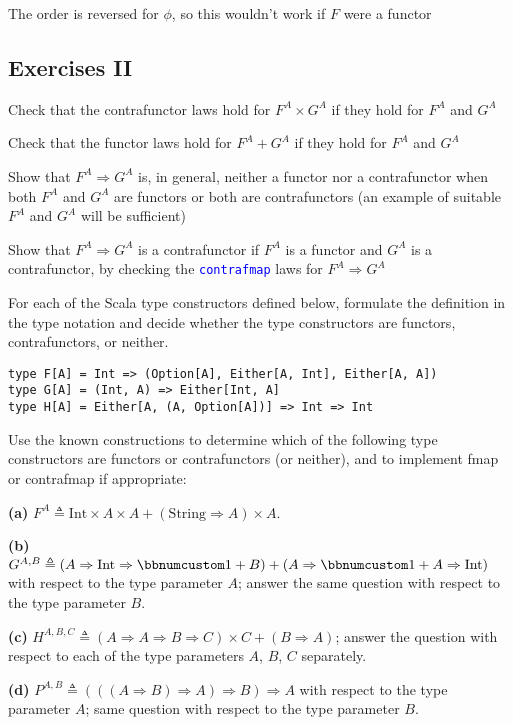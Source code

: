 The order is reversed for $\phi$, so this wouldn't work if $F$ were
a functor


\subsection{Exercises II}

Check that the contrafunctor laws hold for $F^{A}\times G^{A}$ if
they hold for $F^{A}$ and $G^{A}$

Check that the functor laws hold for $F^{A}+G^{A}$ if they hold for
$F^{A}$ and $G^{A}$

Show that $F^{A}\Rightarrow G^{A}$ is, in general, neither a functor
nor a contrafunctor when both $F^{A}$ and $G^{A}$ are functors or
both are contrafunctors (an example of suitable $F^{A}$ and $G^{A}$
will be sufficient)

Show that $F^{A}\Rightarrow G^{A}$ is a contrafunctor if $F^{A}$
is a functor and $G^{A}$ is a contrafunctor, by checking the \texttt{\textcolor{blue}{\footnotesize{}contrafmap}}
laws for $F^{A}\Rightarrow G^{A}$ 

For each of the Scala type constructors defined below, formulate the
definition in the type notation and decide whether the type constructors
are functors, contrafunctors, or neither.
\begin{lstlisting}
type F[A] = Int => (Option[A], Either[A, Int], Either[A, A])
type G[A] = (Int, A) => Either[Int, A]
type H[A] = Either[A, (A, Option[A])] => Int => Int
\end{lstlisting}

Use the known constructions to determine which of the following type
constructors are functors or contrafunctors (or neither), and to implement
fmap or contrafmap if appropriate:

\textbf{(a)} $F^{A}\triangleq\text{Int}\times A\times A+\left(\text{String}\Rightarrow A\right)\times A$.

\textbf{(b)} $G^{A,B}\triangleq\left(A\Rightarrow\text{Int}\Rightarrow\bbnum 1+B\right)+\left(A\Rightarrow\bbnum 1+A\Rightarrow\text{Int}\right)$
with respect to the type parameter $A$; answer the same question
with respect to the type parameter $B$.

\textbf{(c)} $H^{A,B,C}\triangleq\left(A\Rightarrow A\Rightarrow B\Rightarrow C\right)\times C+\left(B\Rightarrow A\right)$;
answer the question with respect to each of the type parameters $A$,
$B$, $C$ separately.

\textbf{(d)} $P^{A,B}\triangleq\left(\left(\left(A\Rightarrow B\right)\Rightarrow A\right)\Rightarrow B\right)\Rightarrow A$
with respect to the type parameter $A$; same question with respect
to the type parameter $B$.


